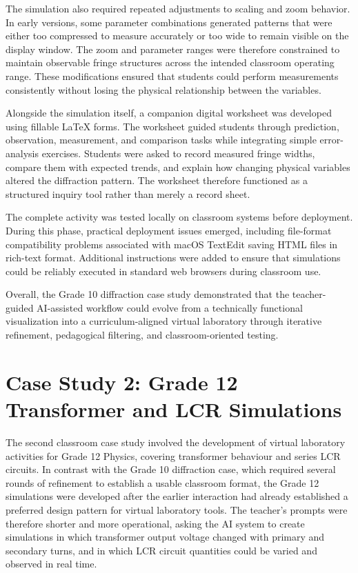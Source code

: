 \documentclass{iopjournal}
\begin{document}
The simulation also required repeated adjustments to scaling and zoom behavior. In early versions, some parameter combinations generated patterns that were either too compressed to measure accurately or too wide to remain visible on the display window. The zoom and parameter ranges were therefore constrained to maintain observable fringe structures across the intended classroom operating range. These modifications ensured that students could perform measurements consistently without losing the physical relationship between the variables.

Alongside the simulation itself, a companion digital worksheet was developed using fillable \LaTeX{} forms. The worksheet guided students through prediction, observation, measurement, and comparison tasks while integrating simple error-analysis exercises. Students were asked to record measured fringe widths, compare them with expected trends, and explain how changing physical variables altered the diffraction pattern. The worksheet therefore functioned as a structured inquiry tool rather than merely a record sheet.

The complete activity was tested locally on classroom systems before deployment. During this phase, practical deployment issues emerged, including file-format compatibility problems associated with macOS TextEdit saving HTML files in rich-text format. Additional instructions were added to ensure that simulations could be reliably executed in standard web browsers during classroom use.


Overall, the Grade 10 diffraction case study demonstrated that the teacher-guided AI-assisted workflow could evolve from a technically functional visualization into a curriculum-aligned virtual laboratory through iterative refinement, pedagogical filtering, and classroom-oriented testing.

\section{Case Study 2: Grade 12 Transformer and LCR Simulations}

The second classroom case study involved the development of virtual laboratory activities for Grade 12 Physics, covering transformer behaviour and series LCR circuits. In contrast with the Grade 10 diffraction case, which required several rounds of refinement to establish a usable classroom format, the Grade 12 simulations were developed after the earlier interaction had already established a preferred design pattern for virtual laboratory tools. The teacher's prompts were therefore shorter and more operational, asking the AI system to create simulations in which transformer output voltage changed with primary and secondary turns, and in which LCR circuit quantities could be varied and observed in real time.
\end{document}
